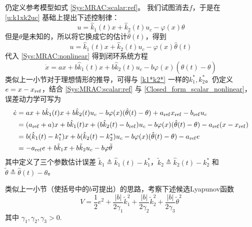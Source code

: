 仍定义参考模型如式 \eqref{Sys:MRAC:scalar:ref}。
我们试图消去$f$，于是在  \eqref{u:k1xk2uc} 基础上提出下述控制律：
\begin{equation*}
  u = \hat{k}_1 (t) x + \hat{k}_2 (t) u_c - \varphi (x) \theta
\end{equation*}
但是$\theta$是未知的，所以将它换成它的估计$\hat{\theta} (t)$，得到
\begin{equation}
  u = \hat{k}_1 (t) x + \hat{k}_2 (t) u_c - \varphi (x) \hat{\theta} (t)
\end{equation}
代入 \eqref{Sys:MRAC:nonlinear} 得到闭环系统方程
\begin{equation}
  \dot{x} = a  x +  b \hat{k}_1 (t) x + b \hat{k}_2 (t) u_c - b \varphi (x) (\hat{\theta} (t) - \theta)
  \label{Closed_form_scalar_nonlinear}
\end{equation}
类似上一小节对于理想情形的推导，可得与 \eqref{k1*k2*} 一样的$k^{\ast}_1, k^{\ast}_2$。仍定义$e=x-x_{\operatorname{ref}}$，结合 \eqref{Sys:MRAC:scalar:ref} 与 \eqref{Closed_form_scalar_nonlinear}，误差动力学可写为
\begin{align}
  \dot{e} & =  a  x +  b \hat{k}_1 (t) x + b \hat{k}_2 (t) u_c - b \varphi (x) (\hat{\theta} (t) - \theta)
  + a_{\operatorname{ref}} x_{\operatorname{ref}} - b_{\operatorname{ref}} u_c \nonumber                                                    \\
          & = (a_{\operatorname{ref}} + a) x +  b \hat{k}_1 (t) x + (b \hat{k}_2 (t) - b_{\operatorname{ref}}) u_c
  - b \varphi (x) (\hat{\theta} (t) - \theta) - a_{\operatorname{ref}} (x-x_{\operatorname{ref}}) \nonumber           \\
          & =  b (\hat{k}_1 (t) - k^{\ast}_1) x + b (\hat{k}_2 (t) - k^{\ast}_2) u_c
  - b \varphi (x) (\hat{\theta} (t) - \theta) - a_{\operatorname{ref}} e \nonumber                                    \\
          & =  - a_{\operatorname{ref}} e + b \tilde{k}_1 x + b \tilde{k}_2 u_c - b \varphi \tilde{\theta}
  \label{err:MRAC:nonlinear}
\end{align}
其中定义了三个参数估计误差 $\tilde{k}_1 \triangleq \hat{k}_1 (t) - k^{\ast}_1$，$\tilde{k}_2 \triangleq \hat{k}_2(t) - k^{\ast}_2$ 和 $\tilde{\theta} \triangleq\hat{\theta} (t) - \theta$。

类似上一小节（使括号中的$b$可提出）的思路，考察下述候选Lyapunov函数
\begin{equation}
  V = \frac{1}{2} e^2 + \frac{| b |}{2 \gamma_1} \tilde{k}^2_1
  +\frac{| b |}{2 \gamma_2} \tilde{k}^2_2 + \frac{| b |}{2 \gamma_3} \tilde{\theta}^2
  \label{Lyafun:ek1k2j}
\end{equation}
其中 $\gamma_1, \gamma_2, \gamma_3 > 0$.

